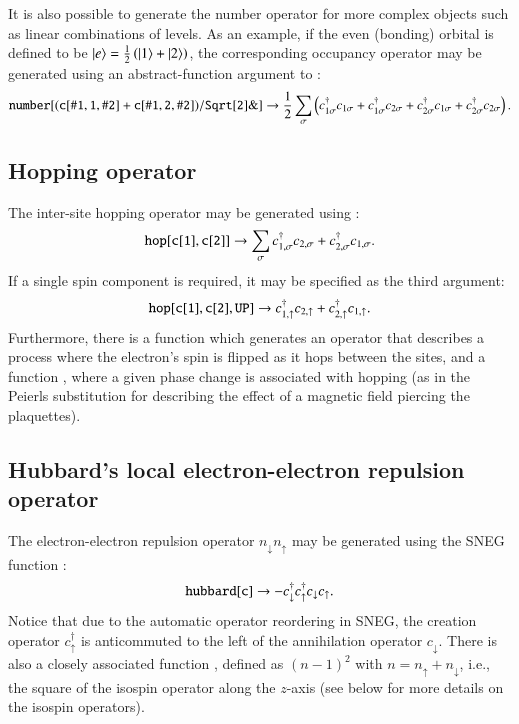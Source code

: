 \documentclass[3p,number,preprint]{elsarticle}
\begin{document}
It is also possible to generate the number operator for more complex
objects such as linear combinations of levels. As an example, if the
even (bonding) orbital is defined to be $\left| e \right\rangle = \frac{1}{2}
\left(\left| 1 \right\rangle + \left| 2 \right\rangle\right)$, the corresponding occupancy operator
may be generated using an abstract-function argument to :
%
\begin{equation}
{\tt number[ (c[\#1,1,\#2]+c[\#1,2,\#2])/Sqrt[2] \&]}
\to \frac{1}{2} \sum_\sigma \left( c^\dag_{1\sigma} c_{1\sigma}
+ c^\dag_{1\sigma} c_{2\sigma} + c^\dag_{2\sigma} c_{1\sigma}
+ c^\dag_{2\sigma} c_{2\sigma} \right).
\end{equation}


\subsection{Hopping operator}

The inter-site hopping operator may be generated using :
%
\begin{equation}
{\tt hop[c[1], c[2]]} \to \sum_\sigma c^\dag_{1,\sigma} c_{2,\sigma}
+ c^\dag_{2,\sigma} c_{1,\sigma}.
\end{equation}
%
If a single spin component is required, it may be specified as
the third argument:
%
\begin{equation}
{\tt hop[c[1], c[2], UP]} \to c^\dag_{1,\uparrow} c_{2,\uparrow}
+ c^\dag_{2,\uparrow} c_{1,\uparrow}.
\end{equation}
%
Furthermore, there is a function  which generates an
operator that describes a process where the electron's spin is flipped
as it hops between the sites, and a function , where a
given phase change is associated with hopping (as in the Peierls
substitution for describing the effect of a magnetic field piercing
the plaquettes).


\subsection{Hubbard's local electron-electron repulsion operator}

The electron-electron repulsion operator $n_\downarrow n_\uparrow$ may
be generated using the SNEG function :
%
\begin{equation}
{\tt hubbard[c]} \to -c^\dag_\downarrow c^\dag_\uparrow c_\downarrow
c_\uparrow.
\end{equation}
%
Notice that due to the automatic operator reordering in SNEG, the
creation operator $c^\dag_\uparrow$ is anticommuted to the left of the
annihilation operator $c_\downarrow$. There is also a closely
associated function , defined as $(n-1)^2$ with
$n=n_\uparrow+n_\downarrow$, i.e., the square of the isospin operator
along the $z$-axis (see below for more details on the isospin
operators).
\end{document}
